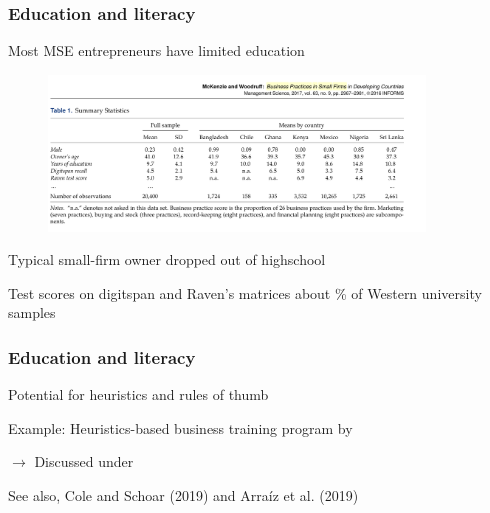 \documentclass[hideothersubsections, usenames,dvipsnames,11pt]{beamer}
\newenvironment{itemize_2pt}{\itemize\addtolength{\itemsep}{2pt}}{\enditemize}
\begin{document}
\begin{frame}
\frametitle{Education and literacy}

Most MSE entrepreneurs have limited education

\vspace{-1.9em}

\begin{figure}[htbp]
	\centering
	\includegraphics[width=27em]{pics/McK2017_educ.png}
	\label{McKenzie(2017): Education and cognitive functioning}
\end{figure}

\vspace{-2.5em}

\begin{itemize_2pt}
	\item Typical small-firm owner dropped out of highschool
	\item Test scores on digitspan and Raven's matrices about \% of Western university samples \textcolor{red}{\citep[comp.][]{}}
\end{itemize_2pt}
\end{frame}

\begin{frame}
\frametitle{Education and literacy}

Potential for heuristics and rules of thumb
\begin{itemize_2pt}
	\item Example: Heuristics-based business training program by \citet{Drexler2014}
	\item[] $\rightarrow$ Discussed under \hyperlink{Drexler_thumb}{}
	\item See also, \textcolor{camel}{Cole and Schoar (2019)} and \textcolor{camel}{Arra\'iz et al. (2019)}
\end{itemize_2pt}
\end{frame}
\end{document}
